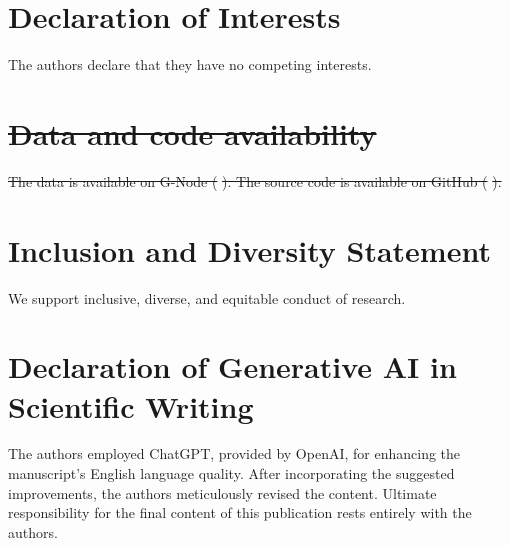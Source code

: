 \documentclass[preprint,review,12pt]{elsarticle}%
\providecommand{\DIFdeltex}[1]{{\protect\color{red}\sout{#1}}}                      %
\providecommand{\DIFdelbegin}{} %
\providecommand{\DIFdelend}{} %
\providecommand{\DIFdel}[1]{\texorpdfstring{\DIFdeltex{#1}}{}} %
\newcommand{\DIFscaledelfig}{0.5}
\newlength{\DIFdelgraphicswidth} %
\newlength{\DIFdelgraphicsheight} %
\newcommand{\DIFdelincludegraphics}[2][]{%
\sbox{\DIFdelgraphicsbox}{\DIFOincludegraphics[#1]{#2}}%
\settoboxwidth{\DIFdelgraphicswidth}{\DIFdelgraphicsbox} %
\settoboxtotalheight{\DIFdelgraphicsheight}{\DIFdelgraphicsbox} %
\scalebox{\DIFscaledelfig}{%
\parbox[b]{\DIFdelgraphicswidth}{\usebox{\DIFdelgraphicsbox}\\[-\baselineskip] \rule{\DIFdelgraphicswidth}{0em}}\llap{\resizebox{\DIFdelgraphicswidth}{\DIFdelgraphicsheight}{%
\setlength{\unitlength}{\DIFdelgraphicswidth}%
\begin{picture}(1,1)%
\thicklines\linethickness{2pt} %
{\color[rgb]{1,0,0}\put(0,0){\framebox(1,1){}}}%
{\color[rgb]{1,0,0}\put(0,0){\line( 1,1){1}}}%
{\color[rgb]{1,0,0}\put(0,1){\line(1,-1){1}}}%
\end{picture}%
}\hspace*{3pt}}} %
} %
\DeclareRobustCommand{\DIFdelbegin}{\DIFOdelbegin \let\includegraphics\DIFdelincludegraphics} %
\DeclareRobustCommand{\DIFdelend}{\DIFOaddend \let\includegraphics\DIFOincludegraphics} %
\begin{document}
\section*{Declaration of Interests}
The authors declare that they have no competing interests.
\label{declaration of interests}

\DIFdelbegin %
\section*{\DIFdel{Data and code availability}}
\DIFdel{The data is available on G-Node (}%
\DIFdel{). The source code is available on GitHub (}%
\DIFdel{).
}%

\DIFdelend {}        
\section*{Inclusion and Diversity Statement}
We support inclusive, diverse, and equitable conduct of research.
\label{inclusion and diversity statement}

\section*{Declaration of Generative AI in Scientific Writing}
The authors employed ChatGPT, provided by OpenAI, for enhancing the manuscript's English language quality. After incorporating the suggested improvements, the authors meticulously revised the content. Ultimate responsibility for the final content of this publication rests entirely with the authors.
\label{declaration of generative ai in scientific writing}

\end{document}
